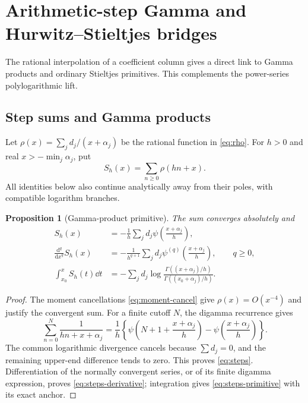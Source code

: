 \documentclass[11pt,letterpaper]{article}
\numberwithin{equation}{section}
\theoremstyle{plain}
\newtheorem{proposition}[theorem]{Proposition}
\theoremstyle{definition}
\theoremstyle{remark}
\begin{document}


\section{Arithmetic-step Gamma and Hurwitz--Stieltjes bridges}
\label{sec:hurwitz}

The rational interpolation of a coefficient column gives a direct link to Gamma products and ordinary Stieltjes primitives. This complements the power-series polylogarithmic lift.

\subsection{Step sums and Gamma products}

Let $\rho(x)=\sum_jd_j/(x+\alpha_j)$ be the rational function in \eqref{eq:rho}. For $h>0$ and real $x> -\min_j\alpha_j$, put
\[
 S_h(x)=\sum_{n\ge0}\rho(hn+x).
\]
All identities below also continue analytically away from their poles, with compatible logarithm branches.

\begin{proposition}[Gamma-product primitive]\label{prop:steps}
The sum converges absolutely and
\begin{align}
 S_h(x)&=-\frac1h\sum_jd_j\psi\left(\frac{x+\alpha_j}{h}\right),\label{eq:steps}\\
 \frac{\mathrm d^q}{\mathrm dx^q}S_h(x)
 &=-\frac1{h^{q+1}}\sum_jd_j\psi^{(q)}\left(\frac{x+\alpha_j}{h}\right),
 \qquad q\ge0,\label{eq:steps-derivative}\\
 \int_{x_0}^xS_h(t)\dd t
 &=-\sum_jd_j\log\frac{\Gamma((x+\alpha_j)/h)}
                              {\Gamma((x_0+\alpha_j)/h)}.\label{eq:steps-primitive}
\end{align}
\end{proposition}
\begin{proof}
The moment cancellations \eqref{eq:moment-cancel} give $\rho(x)=O(x^{-4})$ and justify the convergent sum. For a finite cutoff $N$, the digamma recurrence gives
\[
 \sum_{n=0}^{N}\frac1{hn+x+\alpha_j}
 =\frac1h\left\{\psi\left(N+1+\frac{x+\alpha_j}{h}\right)
                -\psi\left(\frac{x+\alpha_j}{h}\right)\right\}.
\]
The common logarithmic divergence cancels because $\sum d_j=0$, and the remaining upper-end difference tends to zero. This proves \eqref{eq:steps}. Differentiation of the normally convergent series, or of its finite digamma expression, proves \eqref{eq:steps-derivative}; integration gives \eqref{eq:steps-primitive} with its exact anchor.
\end{proof}
\end{document}
